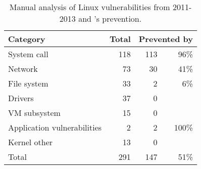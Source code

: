 \begin{table}[t!b!]
\footnotesize
\centering
\begin{tabular}{|l|r|rr|}
\hline
{\bf Category } & {\bf Total} & \multicolumn{2}{|c|}{{\bf Prevented by \sysname{}}}\\

\hline
System call      & 118        &   \hspace{0.2in} 113 &96\% \\\hline 
Network          & 73         &   \hspace{0.2in}30 & 41\% \\\hline 
File system      & 33         &  \hspace{0.2in} 2  & 6\% \\\hline 
Drivers          & 37         &   \hspace{0.2in} 0 &\\\hline 
VM subsystem     & 15         &   \hspace{0.2in} 0 &\\\hline 
Application vulnerabilities & 2   & \hspace{0.2in} 2 & 100\% \\\hline 
Kernel other     & 13      & \hspace{0.2in} 0 &\\\hline 
Total            & 291     & \hspace{0.2in} 147 & 51\% \\\hline 
\end{tabular}
\caption[\sysname{}: analysis of Linux vulnerabilities prevented.]
{Manual analysis of Linux vulnerabilities from 2011-2013 and \sysname{}'s prevention.}
\label{table:vulnerabilities}
\end{table}






